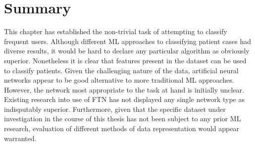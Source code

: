 





\section{Summary}


This chapter has established the non-trivial task of attempting to classify frequent users. Although different ML approaches to classifying patient cases had diverse results, it would be hard to declare any particular algorithm as obviously superior. Nonetheless it is clear that features present in the dataset can be used to classify patients. Given the challenging nature of the data, artificial neural networks appear to be good alternative to more traditional ML approaches. However, the network most appropriate to the task at hand is initially unclear. Existing research into use of FTN has not displayed any single network type as indisputably superior. Furthermore, given that the specific dataset under investigation in the course of this thesis has not been subject to any prior ML research, evaluation of different methods of data representation would appear warranted.     


